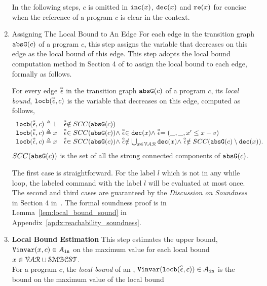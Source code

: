 \begin{enumerate}
In the following steps, $c$ is omitted in $\mathtt{inc}(x)$,
$\mathtt{dec}(x)$ and $\mathtt{re}(x)$ for concise when the reference of a program $c$ is clear in the context.
\item {Assigning The Local Bound to An Edge}
For each edge in the transition graph $\mathtt{abs}{\mathtt{G}}(c)$ of a program $c$,
this step assigns the variable that decreases on this edge as the local bound  of this edge.
This step adopts the local bound computation method in Section 4 of \cite{sinn2017complexity} to assign the local bound to each edge,
formally as follows.
\begin{defn}
  \label{def:ranking_gen}
For every edge $\stackrel{\scriptscriptstyle{\alpha}}{\mathtt{\epsilon}{}}$ in the transition graph $\mathtt{abs}{\mathtt{G}}(c)$ of a program $c$,
its \emph{local bound}, $\mathtt{locb}(\stackrel{\scriptscriptstyle{\alpha}}{\mathtt{\epsilon}{}}, c)$
is the variable that decreases on this edge, computed as follows,
%
\[ 
\begin{array}{ll}
  \mathtt{locb}(\stackrel{\scriptscriptstyle{\alpha}}{\mathtt{\epsilon}{}}, c) \triangleq 1 
  & \stackrel{\scriptscriptstyle{\alpha}}{\mathtt{\epsilon}{}} \notin SCC(\mathtt{abs}{\mathtt{G}}(c))
  \\
  \mathtt{locb}(\stackrel{\scriptscriptstyle{\alpha}}{\mathtt{\epsilon}{}}, c) \triangleq x
  & \stackrel{\scriptscriptstyle{\alpha}}{\mathtt{\epsilon}{}} \in SCC(\mathtt{abs}{\mathtt{G}}(c)) \land \stackrel{\scriptscriptstyle{\alpha}}{\mathtt{\epsilon}{}} \in \mathtt{dec}(x) \land  \stackrel{\scriptscriptstyle{\alpha}}{\mathtt{\epsilon}{}} = (\_, \_ , x' \leq x - v) \\
  \mathtt{locb}(\stackrel{\scriptscriptstyle{\alpha}}{\mathtt{\epsilon}{}}, c) \triangleq x
  & \stackrel{\scriptscriptstyle{\alpha}}{\mathtt{\epsilon}{}} \in SCC(\mathtt{abs}{\mathtt{G}}(c)) \land 
  \stackrel{\scriptscriptstyle{\alpha}}{\mathtt{\epsilon}{}}  \notin \bigcup_{x \in \mathcal{VAR}} \mathtt{dec}(x)
  \land \stackrel{\scriptscriptstyle{\alpha}}{\mathtt{\epsilon}{}} \notin SCC(\mathtt{abs}{\mathtt{G}}(c) \setminus \mathtt{dec}(x)).
\end{array}
\]
$SCC(\mathtt{abs}{\mathtt{G}}(c))$ is the set of all the strong connected components of $\mathtt{abs}{\mathtt{G}}(c)$.
\end{defn}
  The first case is straightforward. 
  For the label $l$ which is not in any while loop, 
  the labeled command with the label $l$ will be 
  evaluated at most once. 
  The second and third cases are guaranteed by the \emph{Discussion on Soundness} in Section 4 in~\cite{sinn2017complexity}.
  The formal soundness proof is in Lemma~\ref{lem:local_bound_sound} in Appendix~\ref{apdx:reachability_soundness}.
\item \textbf{Local Bound Estimation}
This step estimates the upper bound, ${\mathtt{Vinvar}}(x, c) \in \mathcal{A}_{\mathtt{in}}$
on the maximum value for each local bound  $x \in  \mathcal{VAR} \cup \mathcal{SMBCST}$.
\\
For a program $c$, the \emph{local bound} of an ,
${\mathtt{Vinvar}}(\mathtt{locb}(\stackrel{\scriptscriptstyle{\alpha}}{\mathtt{\epsilon}{}}, c)) \in \mathcal{A}_{\mathtt{in}}$ is 
the bound on the maximum value of the local bound 

\end{enumerate}
